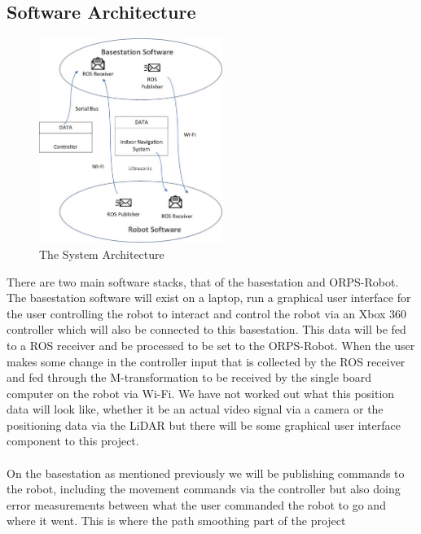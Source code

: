 \documentclass[english,12pt]{article}
\begin{document}
\subsection{Software Architecture}
\begin{figure}
    \vspace{-20pt}
    \begin{center}
      \includegraphics[width=0.53\textwidth]{software_arc.jpg}
    \end{center}
    \vspace{-20pt}
    \caption{The System Architecture}
    \vspace{-10pt}
  \end{figure}
There are two main software stacks, that of the
basestation and ORPS-Robot. The basestation
software will exist on a laptop, run a graphical user
interface for the user controlling the robot to
interact and control the robot via an Xbox 360
controller which will also be connected to this
basestation. This data will be fed to a ROS receiver
and be processed to be set to the ORPS-Robot. When
the user makes some change in the controller input
that is collected by the ROS receiver and fed through
the M-transformation to be received by the
single board computer on the robot via Wi-Fi. We have
not worked out what this position data will look like,
whether it be an actual video signal via a camera or
the positioning data via the LiDAR but there will be
some graphical user interface component to this project.\\\\
On the basestation as mentioned previously we will be publishing commands to the robot, including
the movement commands via the controller but also doing error measurements between what the user
commanded the robot to go and where it went. This is where the path smoothing part of the project
\end{document}

